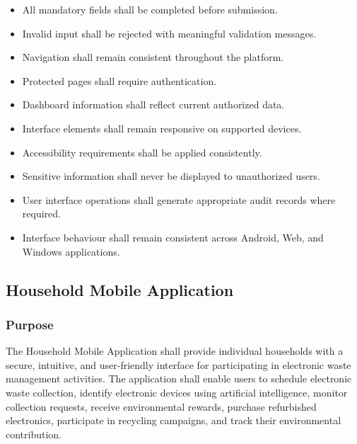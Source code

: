 \begin{itemize}

\item All mandatory fields shall be completed before submission.

\item Invalid input shall be rejected with meaningful validation
messages.

\item Navigation shall remain consistent throughout the platform.

\item Protected pages shall require authentication.

\item Dashboard information shall reflect current authorized data.

\item Interface elements shall remain responsive on supported devices.

\item Accessibility requirements shall be applied consistently.

\item Sensitive information shall never be displayed to unauthorized
users.

\item User interface operations shall generate appropriate audit records
where required.

\item Interface behaviour shall remain consistent across Android, Web,
and Windows applications.

\end{itemize}


\subsection{Household Mobile Application}

\subsubsection*{Purpose}

The Household Mobile Application shall provide individual households
with a secure, intuitive, and user-friendly interface for participating
in electronic waste management activities. The application shall enable
users to schedule electronic waste collection, identify electronic
devices using artificial intelligence, monitor collection requests,
receive environmental rewards, purchase refurbished electronics,
participate in recycling campaigns, and track their environmental
contribution.

